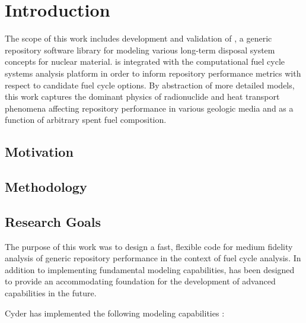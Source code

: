 \chapter{Introduction}\label{ch:introduction}


The scope of this work includes development and validation of \Cyder, a generic 
repository software library for modeling various long-term disposal system concepts 
for nuclear material. \Cyder is integrated with the \Cyclus 
computational fuel cycle systems analysis platform in order to inform 
repository performance metrics with respect to candidate fuel cycle options.  
By abstraction of more detailed models, this work captures the dominant physics 
of radionuclide and heat transport phenomena affecting repository performance 
in various geologic media and as a function of arbitrary spent fuel 
composition. 

\section{Motivation} 


\section{Methodology} 


\section{Research Goals}

The purpose of this work was to design a fast, flexible code for medium
fidelity analysis of generic repository performance in the context of fuel
cycle analysis. In addition to implementing fundamental modeling capabilities,
\Cyder has been designed to provide an accommodating foundation for the
development of advanced capabilities in the future.

Cyder has implemented the following modeling capabilities :

